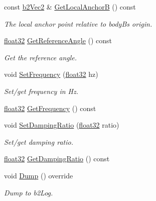 \begin{DoxyCompactItemize}
const \mbox{\hyperlink{structb2_vec2}{b2\+Vec2}} \& \mbox{\hyperlink{classb2_weld_joint_ac0c5e6a53b120f0302d2c6d267d40147}{Get\+Local\+AnchorB}} () const
\begin{DoxyCompactList}\small\item\em The local anchor point relative to bodyB\textquotesingle{}s origin. \end{DoxyCompactList}\item 
\mbox{\hyperlink{b2_settings_8h_aacdc525d6f7bddb3ae95d5c311bd06a1}{float32}} \mbox{\hyperlink{classb2_weld_joint_a2be9f207be5b00b775a7576e16d442ef}{Get\+Reference\+Angle}} () const
\begin{DoxyCompactList}\small\item\em Get the reference angle. \end{DoxyCompactList}\item 
void \mbox{\hyperlink{classb2_weld_joint_a0796404379b7562f1af557729085c447}{Set\+Frequency}} (\mbox{\hyperlink{b2_settings_8h_aacdc525d6f7bddb3ae95d5c311bd06a1}{float32}} hz)
\begin{DoxyCompactList}\small\item\em Set/get frequency in Hz. \end{DoxyCompactList}\item 
\mbox{\hyperlink{b2_settings_8h_aacdc525d6f7bddb3ae95d5c311bd06a1}{float32}} \mbox{\hyperlink{classb2_weld_joint_a36bf80c1c59e28976e286d9ed750b0df}{Get\+Frequency}} () const
\item 
void \mbox{\hyperlink{classb2_weld_joint_aea79865e590edba09eff9d2243689967}{Set\+Damping\+Ratio}} (\mbox{\hyperlink{b2_settings_8h_aacdc525d6f7bddb3ae95d5c311bd06a1}{float32}} ratio)
\begin{DoxyCompactList}\small\item\em Set/get damping ratio. \end{DoxyCompactList}\item 
\mbox{\hyperlink{b2_settings_8h_aacdc525d6f7bddb3ae95d5c311bd06a1}{float32}} \mbox{\hyperlink{classb2_weld_joint_a603d83491d474156b2c09b59a23bfca4}{Get\+Damping\+Ratio}} () const
\item 
void \mbox{\hyperlink{classb2_weld_joint_a59de1cad3229b41886bc23c4d6216e2f}{Dump}} () override
\begin{DoxyCompactList}\small\item\em Dump to b2\+Log. \end{DoxyCompactList}\end{DoxyCompactItemize}
